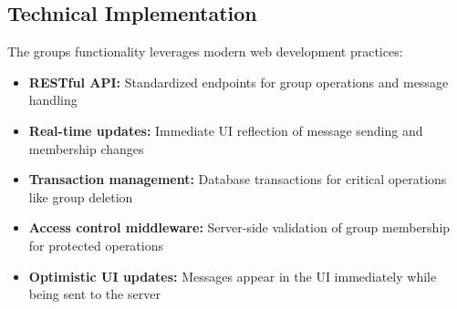 \documentclass{article}
\begin{document}
\subsection{Technical Implementation}
The groups functionality leverages modern web development practices:
\begin{itemize}
    \item \textbf{RESTful API:} Standardized endpoints for group operations and message handling
    \item \textbf{Real-time updates:} Immediate UI reflection of message sending and membership changes
    \item \textbf{Transaction management:} Database transactions for critical operations like group deletion
    \item \textbf{Access control middleware:} Server-side validation of group membership for protected operations
    \item \textbf{Optimistic UI updates:} Messages appear in the UI immediately while being sent to the server
\end{itemize}

\end{document}
